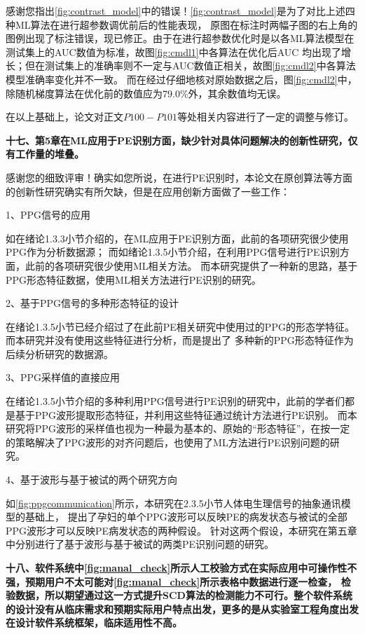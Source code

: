 感谢您指出\autoref{fig:contrast_model}中的错误！\autoref{fig:contrast_model}是为了对比上述四种ML算法在进行超参数调优前后的性能表现，
原图在标注时两幅子图的右上角的图例出现了标注错误，现已修正。由于在进行超参数优化时是以各ML算法模型在测试集上的AUC数值为标准，故图\autoref{fig:cmdl1}中各算法在优化后AUC
均出现了增长；但在测试集上的准确率则不一定与AUC数值正相关，故图\autoref{fig:cmdl2}中各算法模型准确率变化并不一致。
而在经过仔细地核对原始数据之后，图\autoref{fig:cmdl2}中，除随机梯度算法在优化前的数值应为79.0\%外，其余数值均无误。

在以上基础上，论文对正文$P100-P101$等处相关内容进行了一定的调整与修订。

\textbf{十七、第5章在ML应用于PE识别方面，缺少针对具体问题解决的创新性研究，仅有工作量的堆叠。}

感谢您的细致评审！确实如您所说，在进行PE识别时，本论文在原创算法等方面的创新性研究确实有所欠缺，但是在应用创新方面做了一些工作：

1、PPG信号的应用

如在绪论1.3.3小节介绍的，在ML应用于PE识别方面，此前的各项研究很少使用PPG作为分析数据源；
而如绪论1.3.5小节介绍，在利用PPG信号进行PE识别方面，此前的各项研究很少使用ML相关方法。
而本研究提供了一种新的思路，基于PPG形态特征数据，使用ML相关方法进行PE识别的研究。

2、基于PPG信号的多种形态特征的设计

在绪论1.3.5小节已经介绍过了在此前PE相关研究中使用过的PPG的形态学特征。而本研究并没有使用这些特征进行分析，而是提出了
多种新的PPG形态特征作为后续分析研究的数据源。

3、PPG采样值的直接应用

在绪论1.3.5小节介绍的多种利用PPG信号进行PE识别的研究中，此前的学者们都是基于PPG波形提取形态特征，并利用这些特征通过统计方法进行PE识别。
而本研究将PPG波形的采样值也视为一种最为基本的、原始的“形态特征”，在按一定的策略解决了PPG波形的对齐问题后，也使用了ML方法进行PE识别问题的研究。

4、基于波形与基于被试的两个研究方向

如\autoref{fig:ppgcommunication}所示，本研究在2.3.5小节人体电生理信号的抽象通讯模型的基础上，
提出了孕妇的单个PPG波形可以反映PE的病发状态与被试的全部PPG波形才可以反映PE病发状态的两种假设。
针对这两个假设，本研究在第五章中分别进行了基于波形与基于被试的两类PE识别问题的研究。

\textbf{十八、软件系统中\autoref{fig:manal_check}所示人工校验方式在实际应用中可操作性不强，预期用户不太可能对\autoref{fig:manal_check}所示表格中数据进行逐一检查，
检验数据，所以期望通过这一方式提升SCD算法的检测能力不可行。整个软件系统的设计没有从临床需求和预期实际用户特点出发，更多的是从实验室工程角度出发在设计软件系统框架，临床适用性不高。}

